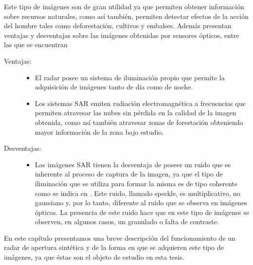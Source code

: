 Este tipo de imágenes son de gran utilidad ya que permiten obtener información sobre recursos naturales, como así también, permiten detectar efectos de la acción del hombre tales como deforestación, cultivos y embalses. Además presentan ventajas y desventajas sobre las imágenes obtenidas por sensores ópticos, entre las que se encuentran 
\begin{description}
\item[Ventajas:]\mbox{}
\begin{itemize}
	\item El radar posee un sistema de iluminación propio que permite la adquisición de imágenes tanto de día como de noche.
	\item Los sistemas SAR emiten radiación electromagnética a frecuencias que permiten atravesar las nubes sin pérdida en la calidad de la imagen obtenida, como así también atravesar zonas de forestación obteniendo mayor información de la zona bajo estudio.
\end{itemize}
\item[Desventajas:]\mbox{}
\begin{itemize}
	\item Las imágenes SAR tienen la desventaja de poseer un ruido que es inherente al proceso de captura de la imagen, ya que el tipo de iliminación que se utiliza para formar la misma es de tipo coherente como se indica en \citet{goodman85}. Este ruido, llamado speckle, es multiplicativo, no gaussiano y, por lo tanto, diferente al ruido que se observa en imágenes ópticas. La presencia de este ruido hace que en este tipo de imágenes se observen, en algunos casos, un granulado o falta de contraste.
\end{itemize}
\end{description}

En este capítulo presentamos una breve descripción del funcionamiento de un radar de apertura sintética y de la forma en que se adquieren este tipo de imágenes, ya que éstas son el objeto de estudio en esta tesis.



